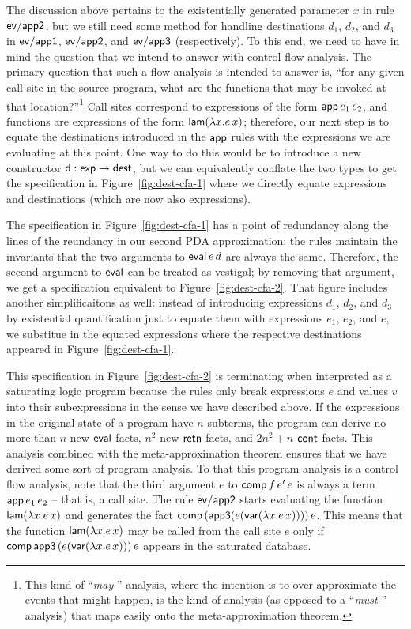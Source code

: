 The discussion above pertains to the existentially generated parameter
$x$ in rule ${\sf ev/app2}$, but we still need some method for
handling destinations $d_1$, $d_2$, and $d_3$ in ${\sf ev/app1}$,
${\sf ev/app2}$, and ${\sf ev/app3}$ (respectively). To this end, we
need to have in mind the question that we intend to answer with
control flow analysis. The primary question that such a flow analysis
is intended to answer is, ``for any given call site in the source
program, what are the functions that may be invoked at that
location?''\footnote{This kind of ``{\it may}-'' analysis, where the
  intention is to over-approximate the events that might happen, is
  the kind of analysis (as opposed to a ``{\it must}-'' analysis) that
  maps easily onto the meta-approximation theorem.} Call sites
correspond to expressions of the form ${\sf app}\,e_1\,e_2$, and
functions are expressions of the form ${\sf lam}(\lambda x.e\,x)$;
therefore, our next step is to equate the destinations introduced in
the ${\sf app}$ rules with the expressions we are evaluating at this
point. One way to do this would be to introduce a new constructor
${\sf d}: {\sf exp} \rightarrow {\sf dest}$, but we can equivalently
conflate the two types to get the specification in
Figure~\ref{fig:dest-cfa-1} where we directly equate expressions and
destinations (which are now also expressions). 

The specification in Figure~\ref{fig:dest-cfa-1} has a point of
redundancy along the lines of the reundancy in our second PDA
approximation: the rules maintain the invariants that the two
arguments to ${\sf eval}\,e\,d$ are always the same. Therefore, the
second argument to ${\sf eval}$ can be treated as vestigal; by
removing that argument, we get a specification equivalent to
Figure~\ref{fig:dest-cfa-2}. That figure includes another
simplificaitons as well: instead of introducing expressions $d_1$,
$d_2$, and $d_3$ by existential quantification just to equate them
with expressions $e_1$, $e_2$, and $e$, we substitue in the equated
expressions where the respective destinations appeared in
Figure~\ref{fig:dest-cfa-1}. 

This specification in Figure~\ref{fig:dest-cfa-2} is terminating when
interpreted as a saturating logic program because the rules only break
expressions $e$ and values $v$ into their subexpressions in the sense
we have described above. If the expressions in the original state of a
program have $n$ subterms, the program can derive no more than $n$ new
${\sf eval}$ facts, $n^2$ new ${\sf retn}$ facts, and $2n^2 + n$ ${\sf
  cont}$ facts. This analysis combined with the meta-approximation
theorem ensures that we have derived some sort of program analysis. To
that this program analysis is a control flow analysis, note that the
third argument $e$ to ${\sf comp}\,f\,e'\,e$ is always a term ${\sf
  app}\,e_1\,e_2$ -- that is, a call site. The rule ${\sf ev/app2}$
starts evaluating the function ${\sf lam}(\lambda x.e\,x)$ and
generates the fact ${\sf comp}\,({\sf app3}(e({\sf var}(\lambda
x.e\,x))))\,e$. This means that the function ${\sf lam}(\lambda
x.e\,x)$ may be called from the call site $e$ only if ${\sf
  comp}\,{\sf app3}\,(e({\sf var}(\lambda x.e\,x)))\,e$ appears in the
saturated database.

